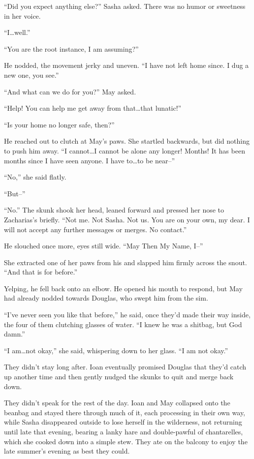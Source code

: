 ``Did you expect anything else?'' Sasha asked. There was no humor or sweetness in her voice.

``I\ldots well.''

``You are the root instance, I am assuming?''

He nodded, the movement jerky and uneven. ``I have not left home since. I dug a new one, you see.''

``And what can we do for you?'' May asked.

``Help! You can help me get away from that\ldots that lunatic!''

``Is your home no longer safe, then?''

He reached out to clutch at May's paws. She startled backwards, but did nothing to push him away. ``I cannot\ldots I cannot be alone any longer! Months! It has been months since I have seen anyone. I have to\ldots to be near--''

``No,'' she said flatly.

``But--''

``No.'' The skunk shook her head, leaned forward and pressed her nose to Zacharias's briefly. ``Not me. Not Sasha. Not us. You are on your own, my dear. I will not accept any further messages or merges. No contact.''

He slouched once more, eyes still wide. ``May Then My Name, I--''

She extracted one of her paws from his and slapped him firmly across the snout. ``And that is for before.''

Yelping, he fell back onto an elbow. He opened his mouth to respond, but May had already nodded towards Douglas, who swept him from the sim.

``I've never seen you like that before,'' he said, once they'd made their way inside, the four of them clutching glasses of water. ``I knew he was a shitbag, but God damn.''

``I am\ldots not okay,'' she said, whispering down to her glass. ``I am not okay.''

They didn't stay long after. Ioan eventually promised Douglas that they'd catch up another time and then gently nudged the skunks to quit and merge back down.

They didn't speak for the rest of the day. Ioan and May collapsed onto the beanbag and stayed there through much of it, each processing in their own way, while Sasha disappeared outside to lose herself in the wilderness, not returning until late that evening, bearing a lanky hare and double-pawful of chantarelles, which she cooked down into a simple stew. They ate on the balcony to enjoy the late summer's evening as best they could.

